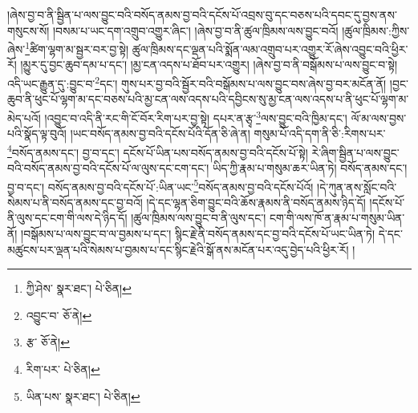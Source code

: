 །ཞེས་བྱ་བ་ནི་སྦྱིན་པ་ལས་བྱུང་བའི་བསོད་ནམས་བྱ་བའི་དངོས་པོ་འབྲས་བུ་དང་བཅས་པའི་དབང་དུ་བྱས་ནས་གསུངས་སོ། །བསམ་པ་ཡང་དག་འགྲུབ་འགྱུར་ཞིང་། །ཞེས་བྱ་བ་ནི་ཚུལ་ཁྲིམས་ལས་བྱུང་བའོ། །ཚུལ་ཁྲིམས་:ཀྱིས་ཞེས་\footnote{ཀྱི་ཤེས་  སྣར་ཐང་།  པེ་ཅིན། }ཚིག་ལྷག་མ་སྦྱར་བར་བྱ་སྟེ། ཚུལ་ཁྲིམས་དང་ལྡན་པའི་སྨོན་ལམ་འགྲུབ་པར་འགྱུར་རོ་ཞེས་འབྱུང་བའི་ཕྱིར་རོ། །མྱུར་དུ་བྱང་ཆུབ་དམ་པ་དང་། །མྱ་ངན་འདས་པ་ཐོབ་པར་འགྱུར། །ཞེས་བྱ་བ་ནི་བསྒོམས་པ་ལས་བྱུང་བ་སྟེ། འདི་ཡང་རྒྱུན་དུ་:བྱུང་བ་\footnote{འབྱུང་བ་  ཅོ་ནེ། }དང་། གུས་པར་བྱ་བའི་སྦྱོར་བའི་བསྒོམས་པ་ལས་བྱུང་བས་ཞེས་བྱ་བར་མངོན་ནོ། །བྱང་ཆུབ་ནི་ཕུང་པོ་ལྷག་མ་དང་བཅས་པའི་མྱ་ངན་ལས་འདས་པའི་དབྱིངས་སུ་མྱ་ངན་ལས་འདས་པ་ནི་ཕུང་པོ་ལྷག་མ་མེད་པའོ། །འབྱུང་བ་འདི་ནི་རང་གི་ངོ་བོར་རིག་པར་བྱ་སྟེ། དཔར་ན་རྩྭ་\footnote{རྩ་  ཅོ་ནེ། }ལས་བྱུང་བའི་ཁྱིམ་དང་། ལོ་མ་ལས་བྱས་པའི་སྣོད་ལྟ་བུའོ། །ཡང་བསོད་ནམས་བྱ་བའི་དངོས་པོའི་དོན་ཅི་ཞེ་ན། གསུམ་པོ་འདི་དག་ནི་ཅི་:རིགས་པར་\footnote{རིག་པར་  པེ་ཅིན། }བསོད་ནམས་དང་། བྱ་བ་དང་། དངོས་པོ་ཡིན་པས་བསོད་ནམས་བྱ་བའི་དངོས་པོ་སྟེ། རེ་ཞིག་སྦྱིན་པ་ལས་བྱུང་བའི་བསོད་ནམས་བྱ་བའི་དངོས་པོ་ལ་ལུས་དང་ངག་དང་། ཡིད་ཀྱི་རྣམ་པ་གསུམ་ཆར་ཡིན་ཏེ། བསོད་ནམས་དང་། བྱ་བ་དང་། བསོད་ནམས་བྱ་བའི་དངོས་པོ་:ཡིན་ཡང་\footnote{ཡིན་པས་  སྣར་ཐང་།  པེ་ཅིན། }བསོད་ནམས་བྱ་བའི་དངོས་པོའོ། །དེ་ཀུན་ནས་སློང་བའི་སེམས་པ་ནི་བསོད་ནམས་དང་བྱ་བའོ། །དེ་དང་ལྷན་ཅིག་བྱུང་བའི་ཆོས་རྣམས་ནི་བསོད་ནམས་ཉིད་དོ། །དངོས་པོ་ནི་ལུས་དང་ངག་གི་ལས་དེ་ཉིད་དོ། །ཚུལ་ཁྲིམས་ལས་བྱུང་བ་ནི་ལུས་དང་། ངག་གི་ལས་ཁོ་ན་རྣམ་པ་གསུམ་ཡིན་ནོ། །བསྒོམས་པ་ལས་བྱུང་བ་ལ་བྱམས་པ་དང་། སྙིང་རྗེ་ནི་བསོད་ནམས་དང་བྱ་བའི་དངོས་པོ་ཡང་ཡིན་ཏེ། དེ་དང་མཚུངས་པར་ལྡན་པའི་སེམས་པ་བྱམས་པ་དང་སྙིང་རྗེའི་སྒོ་ནས་མངོན་པར་འདུ་བྱེད་པའི་ཕྱིར་རོ། །
